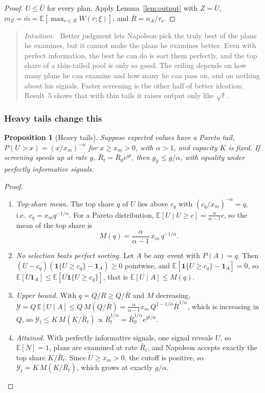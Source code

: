 \documentclass[11pt]{article}
\newcommand{\Nap}{\textcolor{nap}{Napoleon}}
\newtheorem*{proposition*}{Proposition}
\theoremstyle{remark}
\newenvironment{intuition}{\begin{quote}\small\color{muted}\textit{Intuition.}\ }{\end{quote}}
\newcommand{\E}{\mathbb{E}}
\newcommand{\Ycal}{\mathcal{Y}}
\newcommand{\Rcal}{\mathcal{R}}
\begin{document}
\begin{proof}
$U\le\bar U$ for every plan. Apply Lemma~\ref{lem:output} with $Z=\bar U$, $m_Z=\bar m=\E[\max_{r\in\Rcal}W(r;\xi)]$, and $\bar R=n_A/\tau_s$.
\end{proof}

\begin{intuition}
Better judgment lets \Nap{} pick the truly best of the plans he examines, but it cannot make the plans he examines better. Even with perfect information, the best he can do is sort them perfectly, and the top share of a thin-tailed pool is only so good. The ceiling depends on how many plans he can examine and how many he can pass on, and on nothing about his signals. Faster screening is the other half of better ideation; Result~5 shows that with thin tails it raises output only like $\sqrt t$.
\end{intuition}

\subsubsection*{Heavy tails change this}\label{sec:heavy}

\begin{proposition*}[Heavy tails]
Suppose expected values have a Pareto tail, $P(U>x)=(x/x_m)^{-\alpha}$ for $x\ge x_m>0$, with $\alpha>1$, and capacity $K$ is fixed. If screening speeds up at rate $g$, $\bar R_t=\bar R_0e^{gt}$, then $g_{\Ycal}\le g/\alpha$, with equality under perfectly informative signals.
\end{proposition*}

\begin{proof}
\begin{enumerate}
  \item \emph{Top-share mean.} The top share $q$ of $U$ lies above $c_q$ with $(c_q/x_m)^{-\alpha}=q$, i.e.\ $c_q=x_mq^{-1/\alpha}$. For a Pareto distribution, $\E[U\mid U\ge c]=\frac{\alpha}{\alpha-1}c$, so the mean of the top share is
  \[
  M(q)=\frac{\alpha}{\alpha-1}\,x_m\,q^{-1/\alpha}.
  \]
  \item \emph{No selection beats perfect sorting.} Let $A$ be any event with $P(A)=q$. Then $(U-c_q)(\mathbf 1\{U\ge c_q\}-\mathbf 1_A)\ge0$ pointwise, and $\E[\mathbf 1\{U\ge c_q\}-\mathbf 1_A]=0$, so $\E[U\mathbf 1_A]\le\E[U\mathbf 1\{U\ge c_q\}]$, that is $\E[U\mid A]\le M(q)$.
  \item \emph{Upper bound.} With $q=Q/R\ge Q/\bar R$ and $M$ decreasing, $\Ycal=Q\,\E[U\mid A]\le Q\,M(Q/\bar R)=\frac{\alpha}{\alpha-1}x_m\,Q^{1-1/\alpha}\bar R^{1/\alpha}$, which is increasing in $Q$, so $\Ycal_t\le K\,M(K/\bar R_t)\propto\bar R_t^{1/\alpha}=\bar R_0^{1/\alpha}e^{gt/\alpha}$.
  \item \emph{Attained.} With perfectly informative signals, one signal reveals $U$, so $\E[N]=1$, plans are examined at rate $\bar R_t$, and \Nap{} accepts exactly the top share $K/\bar R_t$. Since $U\ge x_m>0$, the cutoff is positive, so $\Ycal_t=K\,M(K/\bar R_t)$, which grows at exactly $g/\alpha$. \qedhere
\end{enumerate}
\end{proof}
\end{document}
